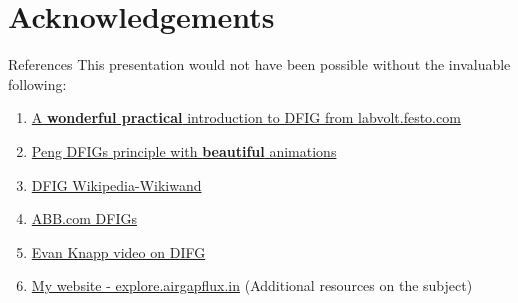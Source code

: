 \documentclass{beamer}
\begin{document}
\section{Acknowledgements}
\begin{frame}{References }
    This presentation would not have been possible without the invaluable following:
    \vspace{0.1in}
    \begin{enumerate}
        \item \href{https://web.archive.org/web/20230526092355/https://labvolt.festo.com/downloads/86376_F0.pdf}{A \textbf{wonderful practical} introduction to DFIG from labvolt.festo.com}

        \item \href{https://www.pengky.cn/zz-horizontal-axis-turbine/13-doubly-fed-wind-turbine-principle/doubly-fed-wind-turbine-principle.html}{Peng DFIGs principle with \textbf{beautiful} animations}
      
        \item \href{https://www.wikiwand.com/en/Doubly_fed_electric_machine}{DFIG Wikipedia-Wikiwand}
        
        \item \href{https://new.abb.com/motors-generators/generators/generators-for-renewables/doubly-fed-generators}{ABB.com DFIGs}
        
        \item \href{https://www.youtube.com/watch?v=Fvc2I0L2vMU}{Evan Knapp video on DIFG}
        
        \item \href{https://explore.airgapflux.in}{My website - explore.airgapflux.in} (Additional resources on the subject)

    \end{enumerate}
\end{frame}
\end{document}
